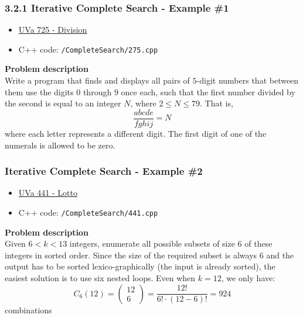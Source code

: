 \documentclass{beamer}
\begin{document}
\begin{frame}[fragile]
\frametitle{3.2.1 Iterative Complete Search - Example \#1}

\begin{itemize}
	\item \href{https://onlinejudge.org/index.php?option=com_onlinejudge&Itemid=8&category=9&page=show_problem&problem=666}{UVa 725 - Division}
    \item C++ code: \color{red}\verb|/CompleteSearch/275.cpp|\color{black}
\end{itemize}

\vspace{0.5cm}

\color{red}\textbf{Problem description}\color{black}\\ 

Write a program that finds and displays all pairs of $5$-digit numbers that between them use the digits $0$ through $9$ once each, such that the first number divided by the second is equal to an integer $N$, where $2 \leq N \leq 79$. That is, $$\frac{abcde}{fghij} = N$$ where each letter represents a different digit. The first digit of one of the numerals is allowed to be zero.

\end{frame}

\begin{frame}[fragile]
\frametitle{Iterative Complete Search - Example \#2}

\begin{itemize}
	\item \href{https://onlinejudge.org/index.php?option=com_onlinejudge&Itemid=8&category=6&page=show_problem&problem=382}{UVa 441 - Lotto}
    \item C++ code: \color{red}\verb|/CompleteSearch/441.cpp|\color{black}
\end{itemize}

\vspace{0.5cm}

\color{red}\textbf{Problem description}\color{black}\\ 
Given $6 < k < 13$ integers, enumerate all possible subsets of size $6$ of these integers in sorted order. Since the size of the required subset is always $6$ and the output has to be sorted lexico-graphically (the input is already sorted), the easiest solution is to use six nested loops. Even when $k = 12$, we only have: $$C_6(12) = \begin{pmatrix} 12 \\ 6\end{pmatrix} = \frac{12!}{6!\cdot(12-6)!} = 924$$ combinations

\end{frame}
\end{document}

